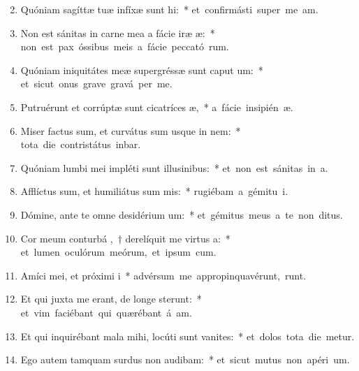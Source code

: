\begin{flushleft}
\begin{enumerate}[leftmargin=*]
\setcounter{enumi}{1}

\item Quóniam sagíttæ tuæ infíxæ sunt hi:~* \mbox{et confirmásti super me  am.}
\item Non est sánitas in carne mea a fácie iræ æ:~* \mbox{non est pax óssibus meis a fácie peccató rum.}
\item Quóniam iniquitátes meæ supergréssæ sunt caput um:~* \mbox{et sicut onus grave gravá  per me.}
\item Putruérunt et corrúptæ sunt cicatríces æ,~* \mbox{a fácie insipién æ.}
\item Miser factus sum, et curvátus sum usque in nem:~* \mbox{tota die contristátus inbar.}
\item Quóniam lumbi mei impléti sunt illusinibus:~* \mbox{et non est sánitas in  a.}
\item Afflíctus sum, et humiliátus sum mis:~* \mbox{rugiébam a gémitu  i.}
\item Dómine, ante te omne desidérium um:~* \mbox{et gémitus meus a te non  ditus.}
\item Cor meum conturbá ,~† derelíquit me virtus a:~* \mbox{et lumen oculórum meórum, et ipsum   cum.}
\item Amíci mei, et próximi i~* \mbox{advérsum me appropinquavérunt,  runt.}
\item Et qui juxta me erant, de longe sterunt:~* \mbox{et vim faciébant qui quærébant á am.}
\item Et qui inquirébant mala mihi, locúti sunt vanites:~* \mbox{et dolos tota die metur.}
\item Ego autem tamquam surdus non audibam:~* \mbox{et sicut mutus non apéri  um.}

\end{enumerate}
\end{flushleft}
